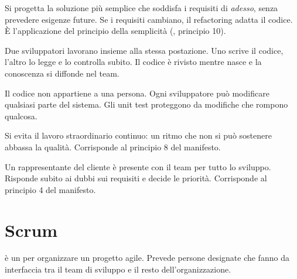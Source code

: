 \begin{description}[leftmargin=0pt, style=unboxed]
  \item[Simple design.] Si progetta la soluzione più semplice che soddisfa i requisiti di \emph{adesso}, senza
    prevedere esigenze future. Se i requisiti cambiano, il refactoring adatta il codice. È l'applicazione del principio
    della semplicità (, principio 10).
  \item[Pair programming.] Due sviluppatori lavorano insieme alla stessa postazione. Uno scrive il codice, l'altro lo
    legge e lo controlla subito. Il codice è rivisto mentre nasce e la conoscenza si diffonde nel team.
  \item[Collective ownership.] Il codice non appartiene a una persona. Ogni sviluppatore può modificare qualsiasi
    parte del sistema. Gli unit test proteggono da modifiche che rompono qualcosa.
  \item[Sustainable pace.] Si evita il lavoro straordinario continuo: un ritmo che non si può sostenere abbassa la
    qualità. Corrisponde al principio 8 del manifesto.
  \item[On-site customer.] Un rappresentante del cliente è presente con il team per tutto lo sviluppo. Risponde subito
    ai dubbi sui requisiti e decide le priorità. Corrisponde al principio 4 del manifesto.
\end{description}

\section{Scrum}
\label{sec:agile-scrum}

\begin{definizione}[Scrum]
 è un  per organizzare un progetto agile. Prevede persone designate che fanno da
interfaccia tra il team di sviluppo e il resto dell'organizzazione.
\end{definizione}


